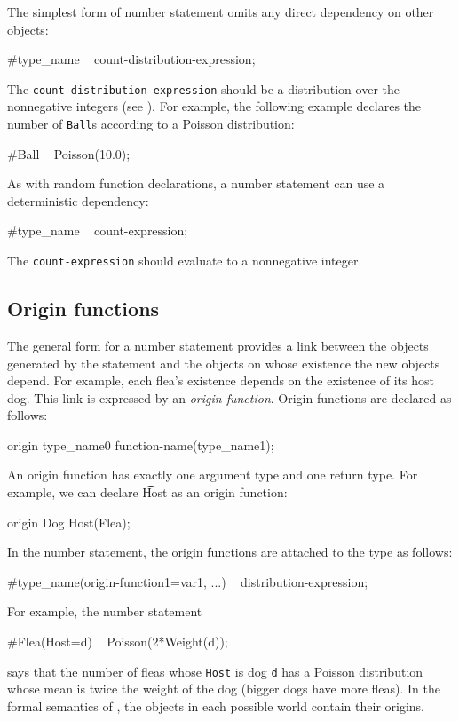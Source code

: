 \documentclass[12pt]{article}
\begin{document}
The simplest form of number statement omits any direct dependency on other objects:
\begin{blogcode}
#type_name ~ count-distribution-expression;
\end{blogcode}
The {\tt count-distribution-expression} should be a distribution over
the nonnegative integers (see ).
For example, the following example declares the number of \texttt{Ball}s according to a Poisson distribution:
\begin{blogcode}
#Ball ~ Poisson(10.0);
\end{blogcode}
As with random function declarations, a number statement can use a deterministic dependency:
\begin{blogcode}
#type_name ~ count-expression;
\end{blogcode}
The {\tt count-expression} should evaluate to a nonnegative integer.

\subsection{Origin functions}\label{origin-section}
The general form for a number statement provides a link between the objects generated by the statement
and the objects on whose existence the new objects depend. For example, each flea's existence
depends on the existence of its host dog. This link is expressed by an {\em origin function}.
Origin functions are declared as follows:
\begin{blogcode}
origin type_name0 function-name(type_name1);
\end{blogcode}
An origin function has exactly one argument type and one return type.  
For example, we can declare {\t Host} as an origin function:
\begin{blogcode}
origin Dog Host(Flea);
\end{blogcode}

In the number statement, the origin functions are attached to the type 
as follows:
\begin{blogcode}
#type_name(origin-function1=var1, ...) ~ distribution-expression;
\end{blogcode}
For example, the number statement
\begin{blogcode}
#Flea(Host=d) ~ Poisson(2*Weight(d));
\end{blogcode}
says that the number of fleas whose {\tt Host} is dog {\tt d} has a Poisson distribution whose mean is twice the weight of the dog (bigger dogs have more fleas).
In the formal semantics of \bl, the objects in each possible world contain their origins.
\end{document}
